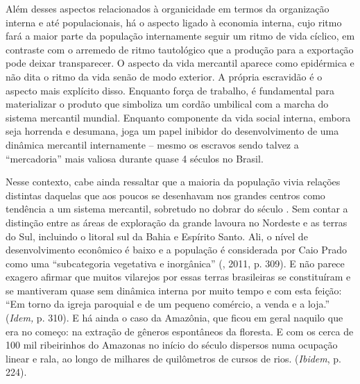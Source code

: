 Além desses aspectos relacionados à organicidade em termos da
organização interna e até populacionais, há o aspecto ligado à economia
interna, cujo ritmo fará a maior parte da população internamente seguir
um ritmo de vida cíclico, em contraste com o arremedo de ritmo
tautológico que a produção para a exportação pode deixar transparecer. O
aspecto da vida mercantil aparece como epidérmica e não dita o ritmo da
vida senão de modo exterior. A própria escravidão é o aspecto mais
explícito disso. Enquanto força de trabalho, é fundamental para
materializar o produto que simboliza um cordão umbilical com a marcha do
sistema mercantil mundial. Enquanto componente da vida social interna,
embora seja horrenda e desumana, joga um papel inibidor do
desenvolvimento de uma dinâmica mercantil internamente -- mesmo os
escravos sendo talvez a ``mercadoria'' mais valiosa durante quase 4
séculos no Brasil.

Nesse contexto, cabe ainda ressaltar que a maioria da população vivia
relações distintas daquelas que aos poucos se desenhavam nos grandes
centros como tendência a um sistema mercantil, sobretudo no dobrar do
século . Sem contar a distinção entre as áreas de exploração da
grande lavoura no Nordeste e as terras do Sul, incluindo o litoral sul
da Bahia e Espírito Santo. Ali, o nível de desenvolvimento econômico é
baixo e a população é considerada por Caio Prado como uma ``subcategoria
vegetativa e inorgânica'' (, 2011, p. 309). E não parece exagero
afirmar que muitos vilarejos por essas terras brasileiras se
constituíram e se mantiveram quase sem dinâmica interna por muito tempo
e com esta feição: ``Em torno da igreja paroquial e de um pequeno
comércio, a venda e a loja.'' (\emph{Idem,} p. 310). E há ainda o caso
da Amazônia, que ficou em geral naquilo que era no começo: na extração
de gêneros espontâneos da floresta. E com os cerca de 100 mil
ribeirinhos do Amazonas no início do século  dispersos numa ocupação
linear e rala, ao longo de milhares de quilômetros de cursos de rios.
(\emph{Ibidem}, p. 224).

